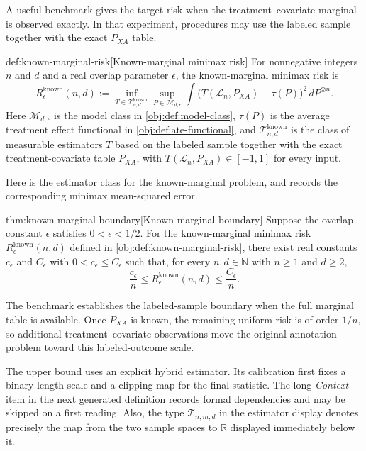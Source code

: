 \documentclass[11pt]{article}
\begin{document}
A useful benchmark gives the target risk when the treatment--covariate marginal is observed exactly. In that experiment, procedures may use the labeled sample together with the exact \(P_{XA}\) table.

\begin{definitionv}{def:known-marginal-risk}[Known-marginal minimax risk]
For nonnegative integers \(n\) and \(d\) and a real overlap parameter \(\epsilon\), the known-marginal minimax risk is
\[
R_\epsilon^{\mathrm{known}}(n,d)
:=
\inf_{T\in\mathcal T^{\mathrm{known}}_{n,d}}
\sup_{P\in\mathcal M_{d,\epsilon}}
\int
\bigl(T(\mathcal L_n,P_{XA})-\tau(P)\bigr)^2
\,dP^{\otimes n}.
\]
Here \(\mathcal M_{d,\epsilon}\) is the model class in \cref{obj:def:model-class}, \(\tau(P)\) is the average treatment effect functional in \cref{obj:def:ate-functional}, and \(\mathcal T^{\mathrm{known}}_{n,d}\) is the class of measurable estimators \(T\) based on the labeled sample together with the exact treatment-covariate table \(P_{XA}\), with \(T(\mathcal L_n,P_{XA})\in[-1,1]\) for every input.
\end{definitionv}

Here  is the estimator class for the known-marginal problem, and  records the corresponding minimax mean-squared error.

\begin{theoremv}{thm:known-marginal-boundary}[Known marginal boundary]
Suppose the overlap constant \(\epsilon\) satisfies \(0<\epsilon<1/2\). For the known-marginal minimax risk \(R_\epsilon^{\mathrm{known}}(n,d)\) defined in \cref{obj:def:known-marginal-risk}, there exist real constants \(c_\epsilon\) and \(C_\epsilon\) with \(0<c_\epsilon\le C_\epsilon\) such that, for every \(n,d\in\mathbb N\) with \(n\ge1\) and \(d\ge2\),
\[
\frac{c_\epsilon}{n}
\le
R_\epsilon^{\mathrm{known}}(n,d)
\le
\frac{C_\epsilon}{n}.
\]
\end{theoremv}

The benchmark establishes the labeled-sample boundary when the full marginal table is available. Once \(P_{XA}\) is known, the remaining uniform risk is of order \(1/n\), so additional treatment--covariate observations move the original annotation problem toward this labeled-outcome scale.

The upper bound uses an explicit hybrid estimator. Its calibration first fixes a binary-length scale and a clipping map for the final statistic. The long \emph{Context} item in the next generated definition records formal dependencies and may be skipped on a first reading. Also, the type \(\mathcal T_{n,m,d}\) in the estimator display denotes precisely the map from the two sample spaces to \(\mathbb R\) displayed immediately below it.
\end{document}
